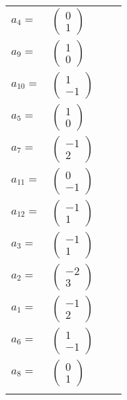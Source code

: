 \documentclass[1p]{elsarticle_modified}
\theoremstyle{definition}
\begin{document}
\begin{tabular}{m{7pt} m{180pt} m{7pt} m{180pt} }
\flushright $a_{4}=$&$\begin{pmatrix}0\\1\end{pmatrix}$ \\
\flushright $a_{9}=$&$\begin{pmatrix}1\\0\end{pmatrix}$ \\
\flushright $a_{10}=$&$\begin{pmatrix}1\\-1\end{pmatrix}$ \\
\flushright $a_{5}=$&$\begin{pmatrix}1\\0\end{pmatrix}$ \\
\flushright $a_{7}=$&$\begin{pmatrix}-1\\2\end{pmatrix}$ \\
\flushright $a_{11}=$&$\begin{pmatrix}0\\-1\end{pmatrix}$ \\
\flushright $a_{12}=$&$\begin{pmatrix}-1\\1\end{pmatrix}$ \\
\flushright $a_{3}=$&$\begin{pmatrix}-1\\1\end{pmatrix}$ \\
\flushright $a_{2}=$&$\begin{pmatrix}-2\\3\end{pmatrix}$ \\
\flushright $a_{1}=$&$\begin{pmatrix}-1\\2\end{pmatrix}$ \\
\flushright $a_{6}=$&$\begin{pmatrix}1\\-1\end{pmatrix}$ \\
\flushright $a_{8}=$&$\begin{pmatrix}0\\1\end{pmatrix}$\\&\end{tabular}
\end{document}
